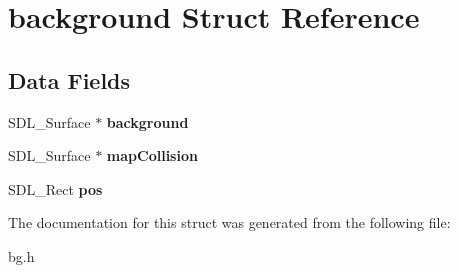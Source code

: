 \hypertarget{structbackground}{}\section{background Struct Reference}
\label{structbackground}
\subsection*{Data Fields}
\begin{DoxyCompactItemize}
\item 
S\+D\+L\+\_\+\+Surface $\ast$ {\bfseries background}\hypertarget{structbackground_a2ae567836475a466a6ac7052cf6a2441}{}\label{structbackground_a2ae567836475a466a6ac7052cf6a2441}

\item 
S\+D\+L\+\_\+\+Surface $\ast$ {\bfseries map\+Collision}\hypertarget{structbackground_a4b9485da15c586b05720ec7f9f4a15c5}{}\label{structbackground_a4b9485da15c586b05720ec7f9f4a15c5}

\item 
S\+D\+L\+\_\+\+Rect {\bfseries pos}\hypertarget{structbackground_aa70f1467505f43c50fec228c21bd7af4}{}\label{structbackground_aa70f1467505f43c50fec228c21bd7af4}

\end{DoxyCompactItemize}


The documentation for this struct was generated from the following file\+:\begin{DoxyCompactItemize}
\item 
bg.\+h\end{DoxyCompactItemize}

